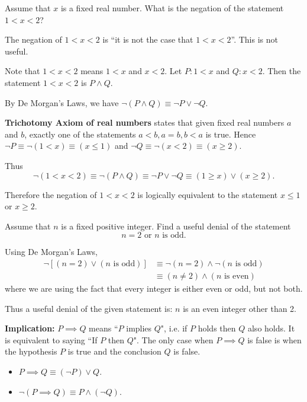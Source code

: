 \begin{exmp}{}{}
Assume that $x$ is a fixed real number. What is the negation of the statement $1<x<2$?
\end{exmp}
\begin{solution}
The negation of $1<x<2$ is ``it is not the case that $1<x<2$”. This is not useful.

Note that $1<x<2$ means $1<x$ and $x<2$. Let $P:1<x$ and $Q:x<2$. Then the statement $1<x<2$ is $P \land Q$.

By De Morgan's Laws, we have $\lnot (P \land Q) \equiv \lnot P \lor \lnot Q$.

\textbf{Trichotomy Axiom of real numbers} states that given fixed real numbers $a$ and $b$, exactly one of the statements $a<b, a=b, b<a$ is true. Hence $\lnot P \equiv \lnot (1<x) \equiv (x \le 1)$ and $\lnot Q \equiv \lnot (x<2) \equiv (x \ge 2)$.

Thus
\[ \lnot (1<x<2) \equiv \lnot (P \land Q) \equiv \lnot P \lor \lnot Q \equiv (1 \ge x) \lor (x \ge 2). \]

Therefore the negation of $1<x<2$ is logically equivalent to the statement $x \le 1$ or $x \ge 2$.
\end{solution}

\begin{exmp}{}{}
Assume that $n$ is a fixed positive integer. Find a useful denial of the statement
\[ n = 2 \text{ or } n \text{ is odd.} \]
\end{exmp}
\begin{solution}
Using De Morgan's Laws,
\begin{align*}
\lnot [(n = 2) \lor (n \text{ is odd})] &\equiv \lnot(n = 2) \land \lnot(n \text{ is odd}) \\
&\equiv (n \neq 2) \land (n \text{ is even})
\end{align*}
where we are using the fact that every integer is either even or odd, but not both.

Thus a useful denial of the given statement is: $n$ is an even integer other than 2.
\end{solution}
\pagebreak

\textbf{Implication:} $P \implies Q$ means ``$P$ implies $Q$", i.e. if $P$ holds then $Q$ also holds. It is equivalent to saying ``If $P$ then $Q$". The only case when $P \implies Q$ is false is when the hypothesis $P$ is true and the conclusion $Q$ is false.

\begin{itemize}
\item $P \implies Q \equiv (\lnot P) \lor Q$.
\item $\lnot (P \implies Q) \equiv P \land (\lnot Q)$.
\end{itemize}

